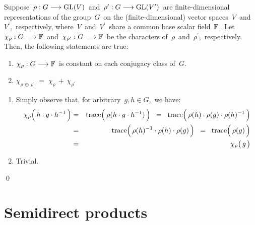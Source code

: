 \vskip 0.5cm
\begin{proposition}
\mbox{}
\vskip 0.1cm
\noindent
Suppose
\,$\rho : G \longrightarrow \textnormal{GL}(V)$\,
and
\,$\rho^{\prime} : G \longrightarrow \textnormal{GL}(V^{\prime})$\,
are finite-dimensional representations of
the group \,$G$\, on the (finite-dimensional) vector spaces
\,$V$\, and \,$V^{\prime}$,\,
respectively, where
\,$V$\, and \,$V^{\prime}$\,
share a common base scalar field \,$\mathbb{F}$.\,
Let
\,$\chi_{\rho} : G \longrightarrow \mathbb{F}$\,
and
\,$\chi_{\rho^{\prime}} : G \longrightarrow \mathbb{F}$\,
be the characters of
\,$\rho$\, and \,$\rho^{\prime}$,\,
respectively.
Then, the following statements are true:
\begin{enumerate}
\item
	$\chi_{\rho} : G \longrightarrow \mathbb{F}$\,
	is constant on each conjugacy class of \,$G$.\,
\item
	$\chi_{\rho\,\oplus\,\rho^{\prime}} \; = \; \chi_{\rho} \,+\, \chi_{\rho^{\prime}}$\,
\end{enumerate}
\end{proposition}
\proof
\begin{enumerate}
\item
	Simply observe that, for arbitrary
	\,$g, h \in G$,\,
	we have:
	\begin{eqnarray*}
	\chi_{\rho}\!\left(\,h \cdot \overset{{\color{white}1}}{g} \cdot h^{-1}\,\right)
	& = &
		\trace\!\left(\,\rho(h \cdot \overset{{\color{white}1}}{g} \cdot h^{-1})\,\right)
	\;\; = \;\;
		\trace\!\left(\,\rho(h) \cdot \rho(\overset{{\color{white}1}}{g}) \cdot \rho(h)^{-1}\,\right)
	\\
	& = &
		\trace\!\left(\, \rho(h)^{-1} \cdot \rho(h) \cdot \rho(\overset{{\color{white}1}}{g}) \,\right)
	\;\; = \;\;
		\trace\!\left(\, \rho(\overset{{\color{white}1}}{g}) \,\right)
	\\
	& = &
		\chi_{\rho}\!\left(\, \overset{{\color{white}.}}{g} \,\right)
	\end{eqnarray*}
\item
	Trivial.
\end{enumerate}
\qed


\vskip 1.0cm
\section{Semidirect products}

